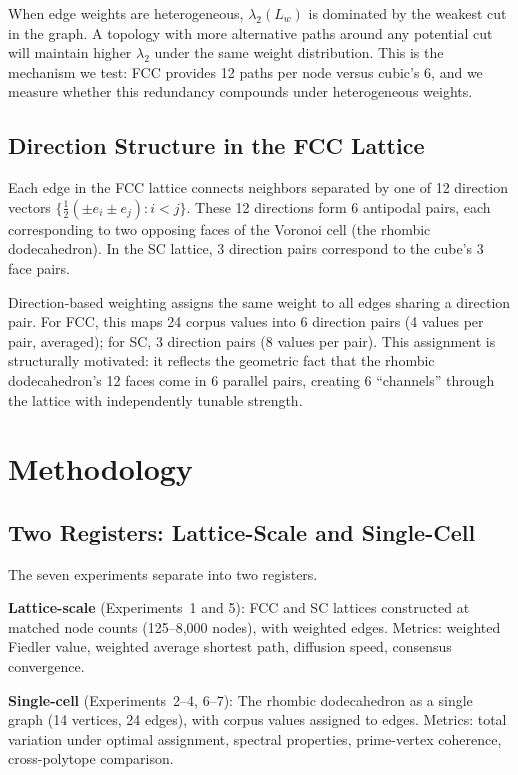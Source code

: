 \documentclass[11pt]{article}
\begin{document}
When edge weights are heterogeneous, $\lambda_2(L_w)$ is dominated
by the weakest cut in the graph. A topology with more alternative
paths around any potential cut will maintain higher $\lambda_2$
under the same weight distribution. This is the mechanism we test:
FCC provides 12 paths per node versus cubic's 6, and we measure
whether this redundancy compounds under heterogeneous weights.

\subsection{Direction Structure in the FCC Lattice}

Each edge in the FCC lattice connects neighbors separated by one
of 12 direction vectors
$\{\frac{1}{2}(\pm e_i \pm e_j) : i < j\}$. These 12 directions
form 6 antipodal pairs, each corresponding to two opposing faces
of the Voronoi cell (the rhombic dodecahedron). In the SC lattice,
3 direction pairs correspond to the cube's 3 face pairs.

Direction-based weighting assigns the same weight to all edges
sharing a direction pair. For FCC, this maps 24 corpus values into
6 direction pairs (4 values per pair, averaged); for SC, 3
direction pairs (8 values per pair). This assignment is
structurally motivated: it reflects the geometric fact that the
rhombic dodecahedron's 12 faces come in 6 parallel pairs,
creating 6 ``channels'' through the lattice with independently
tunable strength.

\section{Methodology}
\label{sec:method}

\subsection{Two Registers: Lattice-Scale and Single-Cell}

The seven experiments separate into two registers.

\textbf{Lattice-scale} (Experiments~1 and 5): FCC and SC lattices
constructed at matched node counts (125--8{,}000 nodes), with
weighted edges. Metrics: weighted Fiedler value, weighted average
shortest path, diffusion speed, consensus convergence.

\textbf{Single-cell} (Experiments~2--4, 6--7): The rhombic
dodecahedron as a single graph (14 vertices, 24 edges), with
corpus values assigned to edges. Metrics: total variation under
optimal assignment, spectral properties, prime-vertex coherence,
cross-polytope comparison.
\end{document}
